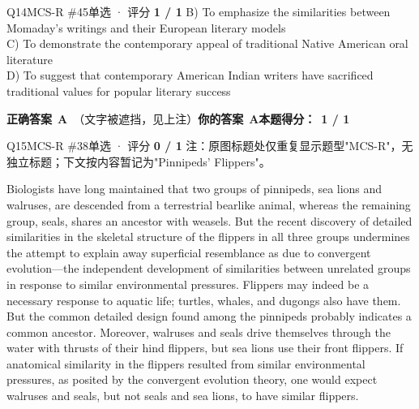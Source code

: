 \begin{qblock}{Q14\quad MCS-R \#45}{单选 · 评分 \textcolor{cAccent}{\bfseries 1 / 1}}
{B) To emphasize the similarities between Momaday's writings and their European literary models\\
C) To demonstrate the contemporary appeal of traditional Native American oral literature\\
D) To suggest that contemporary American Indian writers have sacrificed traditional values for popular literary success}
\par\smallskip
\textbf{正确答案}\ \textcolor{cFix}{\bfseries A}\ {\footnotesize\color{gray}（文字被遮挡，见上注）}\qquad\textbf{你的答案}\ \textcolor{cFix}{\bfseries A}\qquad\textbf{本题得分：}\ {\color{cAccent}\bfseries 1 / 1}
\end{qblock}

\begin{qblock}{Q15\quad MCS-R \#38}{单选 · 评分 \textcolor{cAccent}{\bfseries 0 / 1}}
{\footnotesize\color{gray} 注：原图标题处仅重复显示题型"MCS-R"，无独立标题；下文按内容暂记为"Pinnipeds' Flippers"。}
\begin{promptbox}
Biologists have long maintained that two groups of pinnipeds, sea lions and walruses, are descended from a terrestrial bearlike animal, whereas the remaining group, seals, shares an ancestor with weasels. But the recent discovery of detailed similarities in the skeletal structure of the flippers in all three groups undermines the attempt to explain away superficial resemblance as due to convergent evolution---the independent development of similarities between unrelated groups in response to similar environmental pressures. Flippers may indeed be a necessary response to aquatic life; turtles, whales, and dugongs also have them. But the common detailed design found among the pinnipeds probably indicates a common ancestor. Moreover, walruses and seals drive themselves through the water with thrusts of their hind flippers, but sea lions use their front flippers. If anatomical similarity in the flippers resulted from similar environmental pressures, as posited by the convergent evolution theory, one would expect walruses and seals, but not seals and sea lions, to have similar flippers.
\end{promptbox}

\end{qblock}
